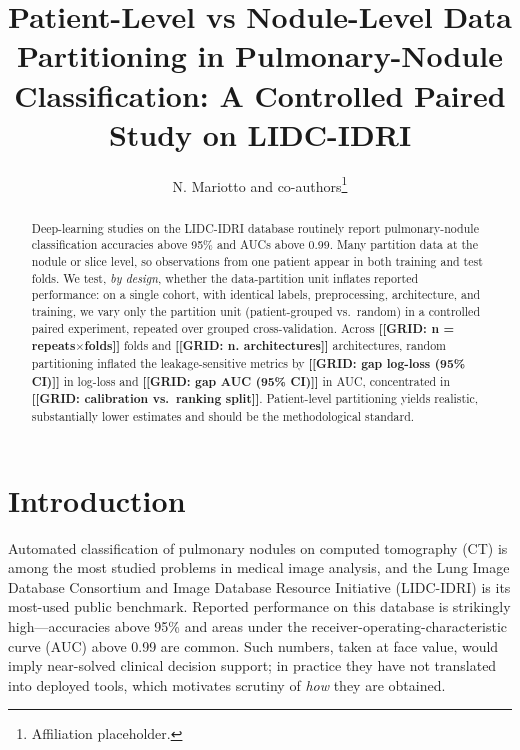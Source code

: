 \documentclass{article}
\newcommand{\gridnum}[1]{{\color{red}\textbf{[[GRID: #1]]}}}
\newcommand{\vcite}[1]{\cite{#1}}
\begin{document}
\title{Patient-Level vs Nodule-Level Data Partitioning in Pulmonary-Nodule
Classification: A Controlled Paired Study on LIDC-IDRI}
\author{N. Mariotto and co-authors\thanks{Affiliation placeholder.}}
\maketitle

\begin{abstract}
Deep-learning studies on the LIDC-IDRI database routinely report pulmonary-nodule classification
accuracies above 95\% and AUCs above 0.99. Many partition data at the nodule or slice level, so
observations from one patient appear in both training and test folds. We test, \emph{by design},
whether the data-partition unit inflates reported performance: on a single cohort, with identical
labels, preprocessing, architecture, and training, we vary only the partition unit
(patient-grouped vs.\ random) in a controlled paired experiment, repeated over grouped
cross-validation. Across \gridnum{n = repeats$\times$folds} folds and
\gridnum{n. architectures} architectures, random partitioning inflated the leakage-sensitive
metrics by \gridnum{gap log-loss (95\% CI)} in log-loss and \gridnum{gap AUC (95\% CI)} in AUC,
concentrated in \gridnum{calibration vs.\ ranking split}. Patient-level partitioning yields
realistic, substantially lower estimates and should be the methodological standard.
\end{abstract}

\section{Introduction}
Automated classification of pulmonary nodules on computed tomography (CT) is among the most
studied problems in medical image analysis, and the Lung Image Database Consortium and Image
Database Resource Initiative (LIDC-IDRI) \vcite{armato2011} is its most-used public benchmark.
Reported performance on this database is strikingly high---accuracies above 95\% and areas under
the receiver-operating-characteristic curve (AUC) above 0.99 are common. Such numbers, taken at
face value, would imply near-solved clinical decision support; in practice they have not
translated into deployed tools, which motivates scrutiny of \emph{how} they are obtained.
\end{document}
